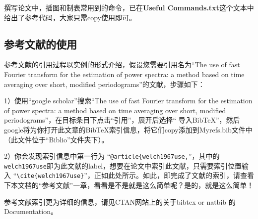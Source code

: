 撰写论文中，插图和制表常用到的命令，已在\textbf{Useful Commands.txt}这个文本中给出了参考代码，大家只需copy使用即可。

\subsection{参考文献的使用}

参考文献的引用过程以实例的形式介绍，假设您需要引用名为“The use of fast Fourier transform for the estimation of power spectra: a method based on time averaging over short, modified periodograms”的文献，步骤如下：

1）使用“google scholar”搜索“The use of fast Fourier transform for the estimation of power spectra: a method based on time averaging over short, modified periodograms”，在目标条目下点击“引用”，展开后选择“ 导入BibTeX”，然后google将为你打开此文章的BibTeX索引信息，将它们copy添加到Myrefs.bib文件中（此文件位于“Biblio”文件夹下）。

2）你会发现索引信息中第一行为 “\verb|@article{welch1967use,|”，其中的 \verb|welch1967use|即为此文献的label，想要在论文中索引此文献，只需要索引位置输入 “\verb|\cite{welch1967use}|”，正如此处所示\cite{welch1967use}。如此，即完成了文献的索引，请查看下本文档的“参考文献”一章，看看是不是就是这么简单呢？是的，就是这么简单！

参考文献索引更为详细的信息，请见CTAN网站上的关于bibtex or natbib 的Documentation。
